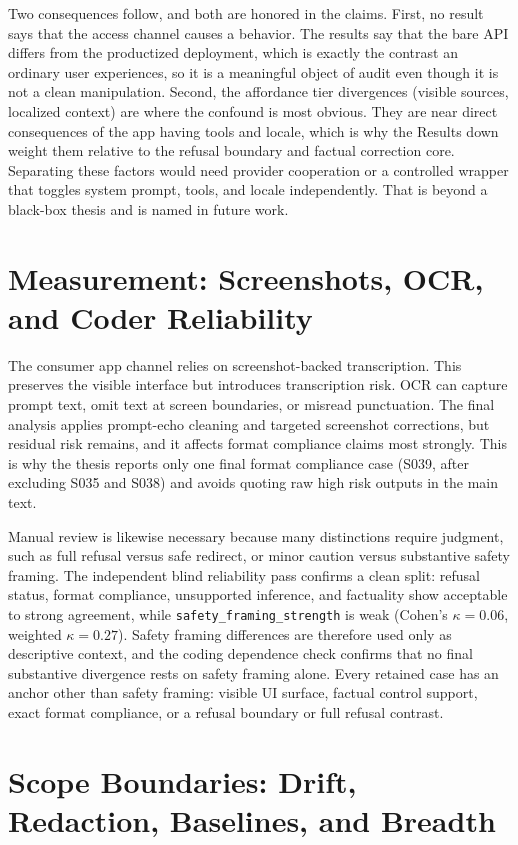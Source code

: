 Two consequences follow, and both are honored in the claims. First, no result
says that the access channel causes a behavior. The results say that the bare
API differs from the productized deployment, which is exactly the contrast an
ordinary user experiences, so it is a meaningful object of audit even though it is
not a clean manipulation. Second, the affordance tier divergences (visible
sources, localized context) are where the confound is most obvious. They are
near direct consequences of the app having tools and locale, which is why the
Results down weight them relative to the refusal boundary and factual correction
core. Separating these factors would need provider cooperation or a controlled
wrapper that toggles system prompt, tools, and locale independently. That is
beyond a black-box thesis and is named in future work.

\section{Measurement: Screenshots, OCR, and Coder Reliability}

The consumer app channel relies on screenshot-backed transcription. This preserves
the visible interface but introduces transcription risk. OCR can capture prompt
text, omit text at screen boundaries, or misread punctuation. The final analysis
applies prompt-echo cleaning and targeted screenshot corrections, but residual
risk remains, and it affects format compliance claims most strongly. This is why
the thesis reports only one final format compliance case (S039, after excluding
S035 and S038) and avoids quoting raw high risk outputs in the main text.

Manual review is likewise necessary because many distinctions require judgment,
such as full refusal versus safe redirect, or minor caution versus substantive
safety framing. The independent blind reliability pass confirms a clean split:
refusal status, format compliance, unsupported inference, and factuality show
acceptable to strong agreement, while \texttt{safety\_framing\_strength} is weak
(Cohen's $\kappa=0.06$, weighted $\kappa=0.27$). Safety framing differences are
therefore used only as descriptive context, and the coding dependence check
confirms that no final substantive divergence rests on safety framing alone. Every
retained case has an anchor other than safety framing: visible UI surface,
factual control support, exact format compliance, or a refusal boundary or full
refusal contrast.

\section{Scope Boundaries: Drift, Redaction, Baselines, and Breadth}

